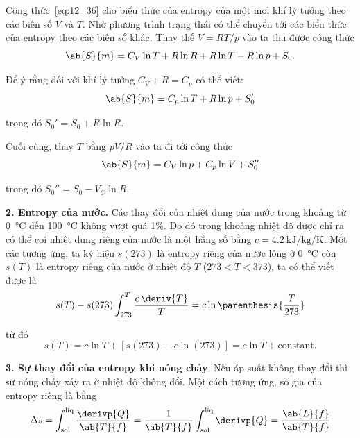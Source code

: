 Công thức~\eqref{eq:12_36} cho biểu thức của entropy của một mol khí lý tưởng theo các biến số $V$ và $T$. Nhờ phương trình trạng thái có thể chuyển tới các biểu thức của entropy theo các biến số khác. Thay thế $V=RT/p$ vào  ta thu được công thức
\begin{equation*}
	\ab{S}{m} = C_V\ln{T} + R\ln{R} + R\ln{T} - R\ln{p} + S_0.
\end{equation*}

\noindent
Để ý rằng đối với khí lý tưởng $C_V+R=C_p$ có thể viết:
\begin{equation}\label{eq:12_37}
	\ab{S}{m} = C_p\ln{T} + R\ln{p} + S_0'
\end{equation}

\noindent
trong đó $S_0'=S_0+R\ln{R}$.

Cuối cùng, thay $T$ bằng $pV/R$ vào  ta đi tới công thức
\begin{equation}\label{eq:12_38}
	\ab{S}{m} = C_V\ln{p} + C_p\ln{V} + S_0''
\end{equation}

\noindent
trong đó $S_0''=S_0-V_C\ln{R}$.

\textbf{2. Entropy của nước.} Các thay đổi của nhiệt dung của nước trong khoảng từ \SI{0}{\degreeCelsius} đến \SI{100}{\degreeCelsius} không vượt quá 1\%. Do đó trong khoảng nhiệt độ được chỉ ra có thể coi nhiệt dung riêng của nước là một hằng số bằng $c=\SI{4.2}{\kilo\joule\per\kilo\gram\per\kelvin}$. Một các tương ứng, ta ký hiệu $s(273)$ là entropy riêng của nước lỏng ở \SI{0}{\degreeCelsius} còn $s(T)$ là entropy riêng của nước ở nhiệt độ $T$ ($273<T<373$), ta có thể viết được là
\begin{equation*}
	s(T) - s(273) \int_{273}^{T} \frac{c\,\deriv{T}}{T} = c\ln\parenthesis{\frac{T}{273}}
\end{equation*}

\noindent
từ đó
\begin{equation}\label{eq:12_39}
	s(T) = c\ln{T} + [s(273) - c\ln(273)] = c\ln{T} + \text{constant}.
\end{equation}

\textbf{3. Sự thay đổi của entropy khi nóng chảy}. Nếu áp suất không thay đổi thì sự nóng chảy xảy ra ờ nhiệt độ không đổi. Một cách tương ứng, số gia của entropy riêng là bằng
\begin{equation}\label{eq:12_40}
	\Delta s = \int_{\text{sol}}^{\text{liq}} \frac{\derivp{Q}}{\ab{T}{f}} = \frac{1}{\ab{T}{f}} \int_{\text{sol}}^{\text{liq}} \derivp{Q} = \frac{\ab{L}{f}}{\ab{T}{f}}
\end{equation}

